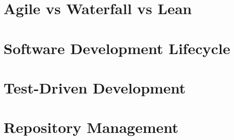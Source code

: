 \section{Agile vs Waterfall vs Lean}


\section{Software Development Lifecycle}


\section{Test-Driven Development}


\section{Repository Management}